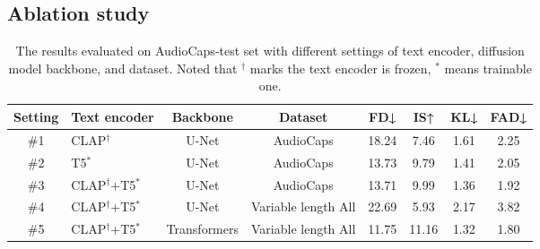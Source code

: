 \documentclass{article}
\begin{document}
\subsection{Ablation study}

\begin{table}[!h]
\centering
\caption{The results evaluated on AudioCaps-test set with different settings of text encoder, diffusion model backbone, and dataset. Noted that $^{\dagger}$ marks the text encoder is frozen, $^{*}$ means trainable one.}
\label{tab:ablation}\small
    \begin{tabular}{c|lcccccc}
    \toprule
    Setting & Text encoder & Backbone & Dataset & FD↓    & IS↑    & KL↓    & FAD↓ \\
    \midrule
    \#1 & CLAP$^{\dagger}$ & U-Net  & AudioCaps & 18.24  & 7.46   & 1.61   & 2.25 \\
    \#2 & T5$^{*}$  & U-Net  & AudioCaps & 13.73  & 9.79   & 1.41   & 2.05 \\
    \#3 & CLAP$^{\dagger}$+T5$^{*}$ & U-Net  & AudioCaps & 13.71  & 9.99   & 1.36   & 1.92 \\
    \#4 & CLAP$^{\dagger}$+T5$^{*}$ & U-Net  & Variable length All & 22.69  & 5.93   & 2.17   & 3.82 \\
    \#5 & CLAP$^{\dagger}$+T5$^{*}$ & Transformers & Variable length All & 11.75  & 11.16  & 1.32   & 1.80 \\
    \bottomrule
    \end{tabular}\end{table}
\end{document}

